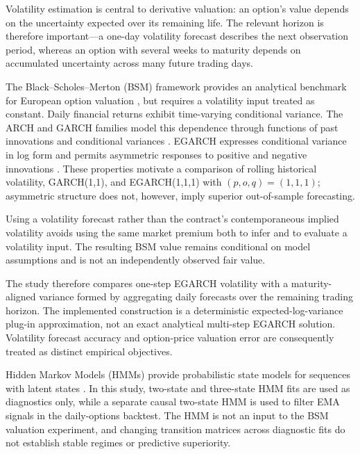 \documentclass[journal]{IEEEtran}
\begin{document}
Volatility estimation is central to derivative valuation: an option's value depends on the uncertainty expected over its remaining life. The relevant horizon is therefore important—a one-day volatility forecast describes the next observation period, whereas an option with several weeks to maturity depends on accumulated uncertainty across many future trading days.

The Black--Scholes--Merton (BSM) framework provides an analytical benchmark for European option valuation \cite{black1973,merton1973}, but requires a volatility input treated as constant. Daily financial returns exhibit time-varying conditional variance. The ARCH and GARCH families model this dependence through functions of past innovations and conditional variances \cite{engle1982,bollerslev1986}. EGARCH expresses conditional variance in log form and permits asymmetric responses to positive and negative innovations \cite{nelson1991}. These properties motivate a comparison of rolling historical volatility, GARCH(1,1), and EGARCH(1,1,1) with $(p,o,q)=(1,1,1)$; asymmetric structure does not, however, imply superior out-of-sample forecasting.

Using a volatility forecast rather than the contract's contemporaneous implied volatility avoids using the same market premium both to infer and to evaluate a volatility input. The resulting BSM value remains conditional on model assumptions and is not an independently observed fair value.

The study therefore compares one-step EGARCH volatility with a maturity-aligned variance formed by aggregating daily forecasts over the remaining trading horizon. The implemented construction is a deterministic expected-log-variance plug-in approximation, not an exact analytical multi-step EGARCH solution. Volatility forecast accuracy and option-price valuation error are consequently treated as distinct empirical objectives.

Hidden Markov Models (HMMs) provide probabilistic state models for sequences with latent states \cite{rabiner1989,hamilton1994}. In this study, two-state and three-state HMM fits are used as diagnostics only, while a separate causal two-state HMM is used to filter EMA signals in the daily-options backtest. The HMM is not an input to the BSM valuation experiment, and changing transition matrices across diagnostic fits do not establish stable regimes or predictive superiority.
\end{document}
